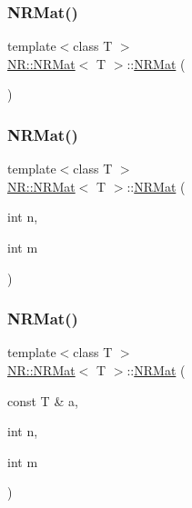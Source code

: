 \subsubsection{\texorpdfstring{NRMat()}{NRMat()}\hspace{0.1cm}{\footnotesize\ttfamily [1/10]}}
{\footnotesize\ttfamily template$<$class T $>$ \\
\mbox{\hyperlink{classNR_1_1NRMat}{N\+R\+::\+N\+R\+Mat}}$<$ T $>$\+::\mbox{\hyperlink{classNR_1_1NRMat}{N\+R\+Mat}} (\begin{DoxyParamCaption}{ }\end{DoxyParamCaption})}

\mbox{\label{classNR_1_1NRMat_a52799868d76fb74a2d73b8d8291a9215}} 
\subsubsection{\texorpdfstring{NRMat()}{NRMat()}\hspace{0.1cm}{\footnotesize\ttfamily [2/10]}}
{\footnotesize\ttfamily template$<$class T $>$ \\
\mbox{\hyperlink{classNR_1_1NRMat}{N\+R\+::\+N\+R\+Mat}}$<$ T $>$\+::\mbox{\hyperlink{classNR_1_1NRMat}{N\+R\+Mat}} (\begin{DoxyParamCaption}\item[{int}]{n,  }\item[{int}]{m }\end{DoxyParamCaption})}

\mbox{\label{classNR_1_1NRMat_a31a0ecf81920c576b25e3c49bfa5e444}} 
\subsubsection{\texorpdfstring{NRMat()}{NRMat()}\hspace{0.1cm}{\footnotesize\ttfamily [3/10]}}
{\footnotesize\ttfamily template$<$class T $>$ \\
\mbox{\hyperlink{classNR_1_1NRMat}{N\+R\+::\+N\+R\+Mat}}$<$ T $>$\+::\mbox{\hyperlink{classNR_1_1NRMat}{N\+R\+Mat}} (\begin{DoxyParamCaption}\item[{const T \&}]{a,  }\item[{int}]{n,  }\item[{int}]{m }\end{DoxyParamCaption})}

